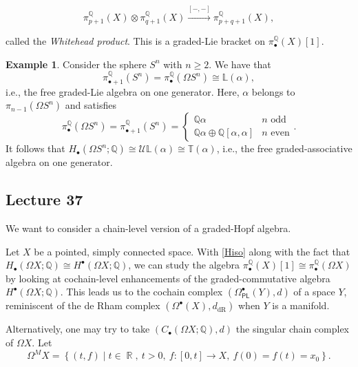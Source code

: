 \documentclass[10pt,letterpaper,cm]{nupset}
\theoremstyle{definition}
\newtheorem{exmp}[defn]{Example}
\theoremstyle{theorem}
\theoremstyle{remark}
\newcommand{\PL}{\mathsf{PL}}
\newcommand{\Q}{\mathbb Q}
\newcommand{\U}{\mathcal U}
\DeclareMathOperator{\R}{\mathbb{R}}
\newcommand{\1}{\mathbb{1}}
\newcommand{\0}{\vec 0}
\DeclareMathOperator{\dr}{dR}
\begin{document}
\[
\pi_{p+1}^{\Q}({X}) \otimes \pi_{q+1}^{\Q}({X}) \xrightarrow{\left[{-}, {-}\right]} \pi_{p+q+1}^{\Q}({X})
,\]

called the \textit{Whitehead product}. This is a graded-Lie bracket on $\pi_{\bullet}^{\Q}(X)[1]$.


\begin{exmp}
Consider the sphere $S^n$ with $n \geq 2$. We have that
\[
\pi_{\bullet +1}^{\Q}(S^n) = \pi_{\bullet}^{\Q}(\Omega{S^n}) \cong \mathbb{L}(\alpha)
,\] i.e., the free graded-Lie algebra on one generator. Here, $\alpha$ belongs to  $\pi_{n-1}(\Omega{S^n})$ and satisfies 
\[
\pi_{\bullet}^{\Q}(\Omega{S^n})  = \pi_{\bullet + 1}^{\Q}(S^n) =
\begin{cases}
\Q{\alpha} & \text{$n$ odd}
\\ \Q{\alpha} \oplus \Q\left[\alpha, \alpha\right] & \text{$n$ even}
\end{cases}.
\]
It follows that $H_{\bullet}(\Omega{S^n}; \Q) \cong \U{\mathbb{L}(\alpha)} \cong \mathbb{T}(\alpha)$, i.e., the free graded-associative algebra on one generator. 
\end{exmp}

\subsection{Lecture 37}

We want to consider a chain-level version of a graded-Hopf algebra.

\medskip

Let $X$ be a pointed, simply connected space. With \eqref{Hiso} along with the fact that $H_{\bullet}(\Omega{X}; \Q) \cong H^{\bullet}(\Omega{X}; \Q)$, we can study the algebra $\pi_{\bullet}^{\Q}(X)\left[1\right] \cong \pi_{\bullet}^{\Q}(\Omega{X})$ by looking at cochain-level enhancements of the graded-commutative algebra $H^{\bullet}(\Omega{X}; \Q)$. This leads us to the cochain complex $\left(\Omega^{\bullet}_{\PL}(Y), d\right)$ of a space $Y$, reminiscent  of the de Rham complex $\left(\Omega^{\bullet}(X), d_{\dr}\right)$ when $Y$ is a manifold.

\medskip

Alternatively, one may try to take $\left(C_{\bullet}(\Omega{X}; \Q), d\right)$ the singular chain complex of $\Omega{X}$. Let
\[
\Omega^M{X} = \left\{ \left(t,f\right) \mid t \in \R, \ t > 0, \ f : \left[0,t\right] \to X, \ f(0) = f(t) = x_0\right\}
.\]
\end{document}
